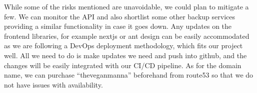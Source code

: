 While some of the risks mentioned are unavoidable, we could plan to mitigate a few. We can monitor the API and 
also shortlist some other backup services providing a similar functionality in case it goes down. Any updates on the 
frontend libraries, for example nextjs or ant design can be easily accommodated as we are following a DevOps deployment 
methodology, which fits our project well. All we need to do is make updates we need and push into github, and the changes 
will be easily integrated with our CI/CD pipeline. As for the domain name, we can purchase “theveganmanna” beforehand from 
route53 so that we do not have issues with availability. 


